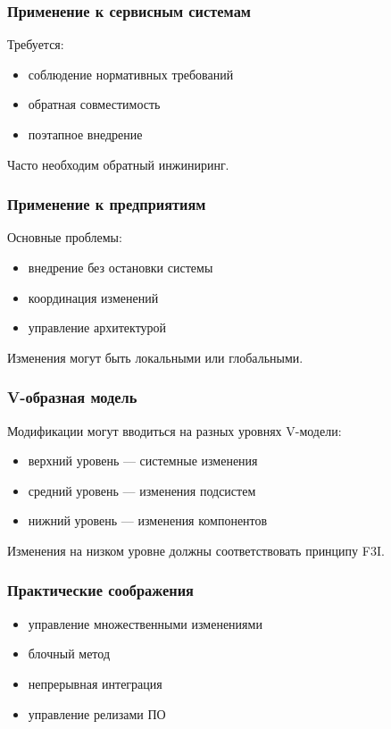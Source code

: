 \documentclass[14pt,a4paper]{extarticle}
\begin{document}
\subsubsection{Применение к сервисным системам}

Требуется:

\begin{itemize}
\item соблюдение нормативных требований
\item обратная совместимость
\item поэтапное внедрение
\end{itemize}

Часто необходим обратный инжиниринг.

\subsubsection{Применение к предприятиям}

Основные проблемы:

\begin{itemize}
\item внедрение без остановки системы
\item координация изменений
\item управление архитектурой
\end{itemize}

Изменения могут быть локальными или глобальными.

\subsubsection{V-образная модель}

Модификации могут вводиться на разных уровнях V-модели:

\begin{itemize}
\item верхний уровень — системные изменения
\item средний уровень — изменения подсистем
\item нижний уровень — изменения компонентов
\end{itemize}

Изменения на низком уровне должны соответствовать принципу F3I.

\subsubsection{Практические соображения}

\begin{itemize}
\item управление множественными изменениями
\item блочный метод
\item непрерывная интеграция
\item управление релизами ПО
\end{itemize}
\end{document}

